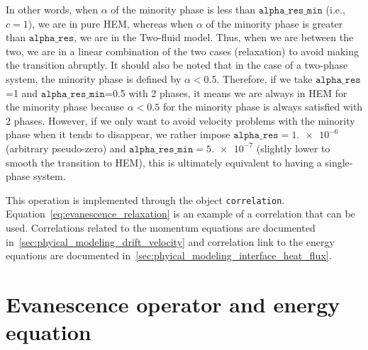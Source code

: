In other words, when $\alpha$ of the minority phase is less than $\texttt{alpha\_res\_min}$ (i.e., $c=1$), we are in pure HEM, whereas when $\alpha$ of the minority phase is greater than $\texttt{alpha\_res}$, we are in the Two-fluid model. Thus, when we are between the two, we are in a linear combination of the two cases (relaxation) to avoid making the transition abruptly. It should also be noted that in the case of a two-phase system, the minority phase is defined by $\alpha<0.5$. Therefore, if we take $\texttt{alpha\_res}$=1 and $\texttt{alpha\_res\_min}$=0.5 with 2 phases, it means we are always in HEM for the minority phase because $\alpha<0.5$ for the minority phase is always satisfied with 2 phases. However, if we only want to avoid velocity problems with the minority phase when it tends to disappear, we rather impose $\texttt{alpha\_res}=\num{1.e-6}$ (arbitrary pseudo-zero) and $\texttt{alpha\_res\_min}=\num{5.e-7}$ (slightly lower to smooth the transition to HEM), this is ultimately equivalent to having a single-phase system.

This operation is implemented through the object \texttt{correlation}. 
Equation~\ref{eq:evanescence_relaxation} is an example of a correlation that can be used. 
Correlations related to the momentum equations are documented in~\ref{sec:phyical_modeling_drift_velocity} and correlation link to the energy equations are documented in~\ref{sec:phyical_modeling_interface_heat_flux}.

\section{Evanescence operator and energy equation\label{sec:evan-ope-and-nrj}}

